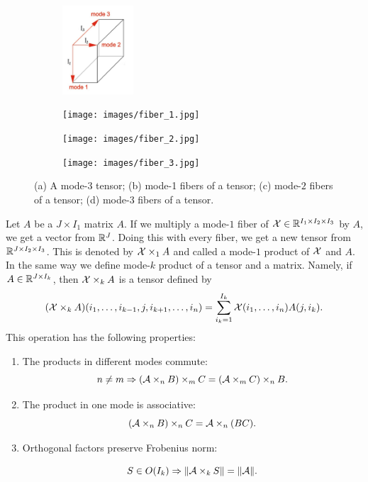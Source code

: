 \begin{figure}[t!]
\centering
    \begin{subfigure}[b]{0.24\textwidth}
        \centering
        \includegraphics[height=1.3in]{images/tensor_3.jpg}
        \caption{}
    \end{subfigure}
    \begin{subfigure}[b]{0.24\textwidth}
        \centering
        \texttt{[image: images/fiber\_1.jpg]}
        \caption{}
    \end{subfigure}
    \begin{subfigure}[b]{0.24\textwidth}
        \centering
        \texttt{[image: images/fiber\_2.jpg]}
        \caption{}
    \end{subfigure}
    \begin{subfigure}[b]{0.24\textwidth}
        \centering
        \texttt{[image: images/fiber\_3.jpg]}
        \caption{}
    \end{subfigure}
    \caption{(a) A mode-$3$ tensor; (b) mode-1 fibers of a tensor; (c) mode-$2$ fibers of a tensor; (d) mode-$3$ fibers of a tensor.}
    \label{fig: img_tensor_3}
\end{figure}


Let $A$ be a $J \times I_1$ matrix $A$. If we multiply a mode-$1$ fiber of $\mathcal{X} \in \mathbb{R}^{I_1 \times I_2 \times I_3}$ by $A$,
we get a vector from $\mathbb{R}^J$. Doing this with every fiber, we get a new tensor from $\mathbb{R}^{J \times I_2 \times I_3}$. This is denoted by 
$\mathcal{X} \times _{1} A$ and called a mode-$1$ product of $\mathcal{X}$ and $A$. In the same way we define mode-$k$ product of a tensor and a matrix. Namely,
if $A \in \mathbb{R}^{J \times I_k}$, then $\mathcal{X} \times_k A$ is a tensor defined by
\begin{equation}
    (\mathcal{X} \times_k A)(i_1, \dots, i_{k-1}, j, i_{k+1}, \dots, i_n) = \sum_{i_k = 1}^{I_k} \mathcal{X}(i_1, \dots, i_n) A(j, i_k).
\end{equation}
This operation has the following properties:
\begin{enumerate}
\item The products in different modes commute:
\begin{equation}
n \not= m \Rightarrow (\mathcal{A} \times _n B) \times_m C = (\mathcal{A} \times _m C) \times_n B.
\end{equation}
\item The product in one mode is associative:
\begin{equation}
(\mathcal{A} \times_n B) \times_n C = \mathcal{A} \times_n (BC).
\end{equation}
\item Orthogonal factors preserve Frobenius norm:

\begin{equation}
\label{orthogonal_norm_inv}
S \in O(I_k)  \Rightarrow \| \mathcal{A} \times_k S \| = \| \mathcal{A} \|.
\end{equation}
\end{enumerate}

